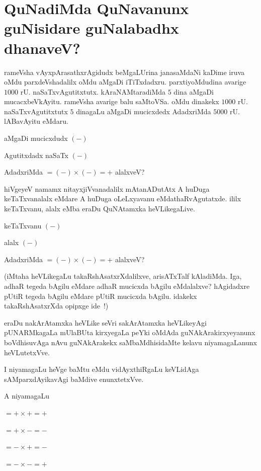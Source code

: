\chapter{QuNadiMda QuNavanunx guNisidare guNalabadhx dhanaveV?}

\qquad rameVsha vAyxpArasathxrAgidudx beMgaLUrina janasaMdaNi kaDime iruva oMdu parxdeVshadalilx oMdu aMgaDi iTiTxdadxru. parxtiyoMdudina avarige $1000$ rU. naSaTxvAgutitxtutx.  kAraNAMtaradiMda $5$ dina aMgaDi mucacxbeVkAyitu. rameVsha avarige balu saMtoVSa. oMdu dinakekx $1000$ rU. naSaTxvAgutitxtutx $5$ dinagaLu aMgaDi mucicxdedx AdadxriMda $5000$ rU. lABavAyitu eMdaru. 

aMgaDi mucicxdudx $(-)$

Agutitxdadx naSaTx $(-)$

AdadxriMda $= (-) \times (-) = + $ alalxveV?

hiVgeyeV namamx nitayxjiVvanadalilx mAtanADutAtx A huDuga keTaTxvanalalx eMdare A huDuga oLeLxyavanu eMdathaRvAgutatxde. ililx keTaTxvanu, alalx eMba eraDu QuNAtamxka heVLikegaLive.

keTaTxvanu $(-)$

alalx $(-)$

AdadxriMda $= (-) \times  (-) = +$ alalxveV?

(iMtaha heVLikegaLu takaRshAsatxrXdalilxve, arisATxTalf kAladiMda. Iga, adhaR tegeda bAgilu eMdare adhaR mucicxda bAgilu eMdalalxve? hAgidadxre pUtiR tegeda bAgilu eMdare pUtiR mucicxda bAgilu. idakekx takaRshAsatxrXda opipxge ide~!)

eraDu nakArAtamxka heVLike seVri sakArAtamxka heVLikeyAgi pUNARMkagaLa mUlaBUta kirxyegaLa peYki oMdAda guNAkArakirxyeyanunx boVdhisuvAga nAvu guNAkArakekx saMbaMdhisidaMte kelavu niyamagaLanunx heVLutetxVve.

I niyamagaLu heVge baMtu eMdu vidAyxthiRgaLu keVLidAga sAMparxdAyikavAgi baMdive enunxtetxVve.

A niyamagaLu

$= + \times + = +$

$= + \times - = -$

$= - \times + = -$

$= - \times - = +$

